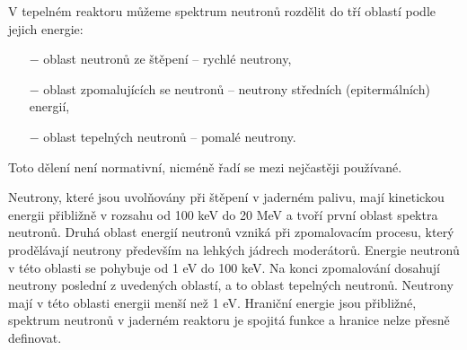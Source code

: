 

V tepelném reaktoru můžeme spektrum neutronů rozdělit do tří oblastí podle jejich energie:

\begin{itemize}%
    \item[$-$] oblast neutronů ze štěpení -- rychlé neutrony,
    \item[$-$] oblast zpomalujících se neutronů -- neutrony středních (epitermálních) energií,
    \item[$-$] oblast tepelných neutronů -- pomalé neutrony.
\end{itemize}

Toto dělení není normativní, nicméně řadí se mezi nejčastěji používané.

Neutrony, které jsou uvolňovány při štěpení v jaderném palivu, mají kinetickou energii přibližně v rozsahu od 100 keV do 20 MeV a tvoří první oblast spektra neutronů. Druhá oblast energií neutronů vzniká při zpomalovacím procesu, který prodělávají neutrony především na lehkých jádrech moderátorů. Energie neutronů v této oblasti se pohybuje od 1 eV do 100 keV. Na konci zpomalování dosahují neutrony poslední z uvedených oblastí, a to oblast tepelných neutronů. Neutrony mají v této oblasti energii menší než 1 eV. Hraniční energie jsou přibližné, spektrum neutronů v jaderném reaktoru je spojitá funkce a hranice nelze přesně definovat.

